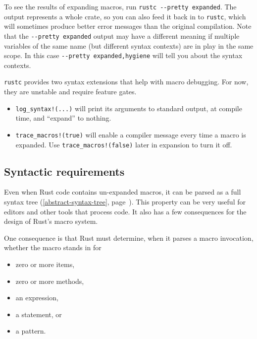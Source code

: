 \documentclass[a4paper,]{book}
\renewcommand*{\hyperref}[2][\ar]{%
  \def\ar{#2}%
  #2 (\autoref{#1}, page~\pageref{#1})}
\begin{document}

To see the results of expanding macros, run
\texttt{rustc\ -\/-pretty\ expanded}. The output represents a whole
crate, so you can also feed it back in to \texttt{rustc}, which will
sometimes produce better error messages than the original compilation.
Note that the \texttt{-\/-pretty\ expanded} output may have a different
meaning if multiple variables of the same name (but different syntax
contexts) are in play in the same scope. In this case
\texttt{-\/-pretty\ expanded,hygiene} will tell you about the syntax
contexts.

\texttt{rustc} provides two syntax extensions that help with macro
debugging. For now, they are unstable and require feature gates.

\begin{itemize}
\item
  \texttt{log\_syntax!(...)} will print its arguments to standard
  output, at compile time, and ``expand'' to nothing.
\item
  \texttt{trace\_macros!(true)} will enable a compiler message every
  time a macro is expanded. Use \texttt{trace\_macros!(false)} later in
  expansion to turn it off.
\end{itemize}

\subsection{Syntactic requirements}\label{syntactic-requirements}

Even when Rust code contains un-expanded macros, it can be parsed as a
full \hyperref[abstract-syntax-tree]{syntax tree}. This property can be
very useful for editors and other tools that process code. It also has a
few consequences for the design of Rust's macro system.

One consequence is that Rust must determine, when it parses a macro
invocation, whether the macro stands in for

\begin{itemize}
\itemsep1pt\parskip0pt
\item
  zero or more items,
\item
  zero or more methods,
\item
  an expression,
\item
  a statement, or
\item
  a pattern.
\end{itemize}
\end{document}
